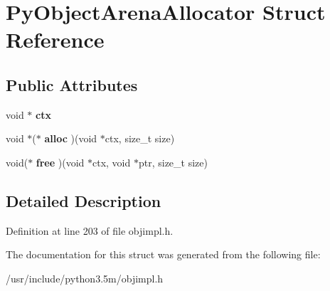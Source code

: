 \hypertarget{structPyObjectArenaAllocator}{}\section{Py\+Object\+Arena\+Allocator Struct Reference}
\label{structPyObjectArenaAllocator}
\subsection*{Public Attributes}
\begin{DoxyCompactItemize}
\item 
void $\ast$ {\bfseries ctx}\hypertarget{structPyObjectArenaAllocator_a852f15a85d328776592c9edc34307e34}{}\label{structPyObjectArenaAllocator_a852f15a85d328776592c9edc34307e34}

\item 
void $\ast$($\ast$ {\bfseries alloc} )(void $\ast$ctx, size\+\_\+t size)\hypertarget{structPyObjectArenaAllocator_a8855f18f4c14de5d5aff581e3711bc55}{}\label{structPyObjectArenaAllocator_a8855f18f4c14de5d5aff581e3711bc55}

\item 
void($\ast$ {\bfseries free} )(void $\ast$ctx, void $\ast$ptr, size\+\_\+t size)\hypertarget{structPyObjectArenaAllocator_a6de36ca8e9479be1e90a0053894e942d}{}\label{structPyObjectArenaAllocator_a6de36ca8e9479be1e90a0053894e942d}

\end{DoxyCompactItemize}


\subsection{Detailed Description}


Definition at line 203 of file objimpl.\+h.



The documentation for this struct was generated from the following file\+:\begin{DoxyCompactItemize}
\item 
/usr/include/python3.\+5m/objimpl.\+h\end{DoxyCompactItemize}
